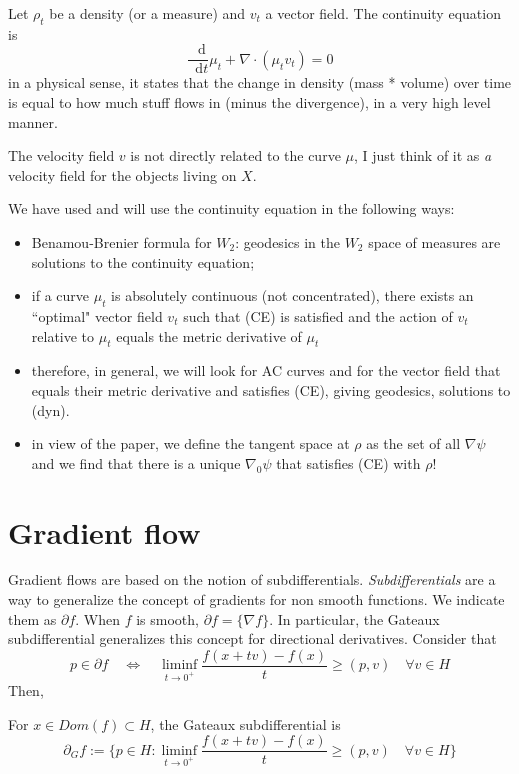 \documentclass[a4paper,12pt,reqno]{amsbook}
\theoremstyle{definition} %
\newcommand*\de{\mathop{}\!\mathrm{d}}
\newcommand{\1}{\mathbbm{1}}
\newcommand{\nabladot}{\nabla \cdot} %
\newcommand{\dt}{\frac{\de}{\de t}}
\theoremstyle{plain}
\theoremstyle{remark}
\begin{document}
{Let $\rho_t$ be a density (or a measure) and $v_t$ a vector field. The continuity equation is
\begin{equation}\tag{CE}
    \dt \mu_t + \nabladot(\mu_tv_t)=0
\end{equation}
in a physical sense, it states that the change in density (mass * volume) over time is equal to how much stuff flows in (minus the divergence), in a very high level manner. 

The velocity field $v$ is not directly related to the curve $\mu$, I just think of it as \textit{a} velocity field for the objects living on $X$.

We have used and will use the continuity equation in the following ways:
\begin{itemize}
    \item Benamou-Brenier formula for $W_2$: geodesics in the $W_2$ space of measures are solutions to the continuity equation;
    \item if a curve $\mu_t$ is absolutely continuous (not concentrated), there exists an ``optimal" vector field $v_t$ such that (CE) is satisfied and the action of $v_t$ relative to $\mu_t$ equals the metric derivative of $\mu_t$
    \item therefore, in general, we will look for AC curves and for the vector field that equals their metric derivative and satisfies (CE), giving geodesics, solutions to (dyn).
    \item in view of the paper, we define the tangent space at $\rho$ as the set of all $\nabla \psi$ and we find that there is a unique $\nabla_0\psi$ that satisfies (CE) with $\rho$!
\end{itemize}

\section{Gradient flow}

Gradient flows are based on the notion of subdifferentials.
\emph{Subdifferentials} are a way to generalize the concept of gradients for non smooth functions. We indicate them as $\partial f$. When $f$ is smooth,  $\partial f = \{\nabla f\}$.
In particular, the Gateaux subdifferential generalizes this concept for directional derivatives. Consider that\[
p \in \partial f \quad \Longleftrightarrow \quad \liminf_{t \to 0^+} \frac{f(x+tv) - f(x)}{t}  \ge (p,v) \quad \forall v \in H
\]
Then,
\begin{definition}
    For $x \in Dom(f) \subset H$, the Gateaux subdifferential is
    \[
    \partial_G f := \Big\{ p \in H : \liminf_{t \to 0^+} \frac{f(x+tv) - f(x)}{t}  \ge (p,v) \quad \forall v \in H\Big\}
    \]
\end{definition}

}
\end{document}
